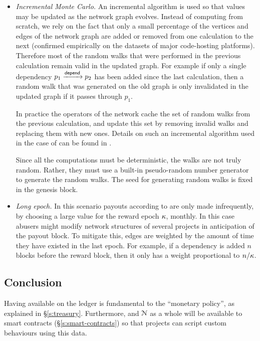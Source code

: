 \begin{itemize}
\item \emph{Incremental Monte Carlo.} An incremental algorithm is used so that
  \osrank{} values may be updated as the network graph evolves. Instead of
  computing \osrank{} from scratch, we rely on the fact that only a small
  percentage of the vertices and edges of the network graph are added or removed
  from one calculation to the next (confirmed empirically on the datasets of
  major code-hosting platforms). Therefore most of the random walks that were
  performed in the previous calculation remain valid in the updated graph. For
  example if only a single dependency $p_1 \xrightarrow[]{\mathsf{depend}} p_2$ has been
  added since the last calculation, then a random walk that was generated on the
  old graph is only invalidated in the updated graph if it passes through $p_1$.

  In practice the operators of the network cache the set of random
  walks from the previous calculation, and update this set by removing
  invalid walks and replacing them with new ones. Details on such an
  incremental algorithm used in the case of \pagerank{} can be found
  in \cite{incr pagerank}.

  Since all the computations must be deterministic, the walks are not
  truly random. Rather, they must use a built-in pseudo-random number
  generator to generate the random walks. The seed for generating
  random walks is fixed in the genesis block.


\item \emph{Long epoch.} In this scenario payouts according to
  \osrank{} are only made infrequently, by choosing a large value for the
  reward epoch $\kappa$, \eg{} monthly.  In this case
  abusers might modify network structures of several projects in
  anticipation of the payout block. To mitigate this, edges are
  weighted by the amount of time they have existed in the last epoch. For
  example, if a dependency is added $n$ blocks before the reward block,
  then it only has a weight proportional to $n/\kappa$.
\end{itemize}

\subsection{Conclusion}

Having \osrank{} available on the ledger is fundamental to the \oscoin{}
``monetary policy'', as explained in \S \ref{s:treasury}. Furthermore,
\osrank{} and $\mathcal{N}$ as a whole will be available to smart contracts
(\S\ref{s:smart-contracts}) so that projects can script custom behaviours using
this data.
